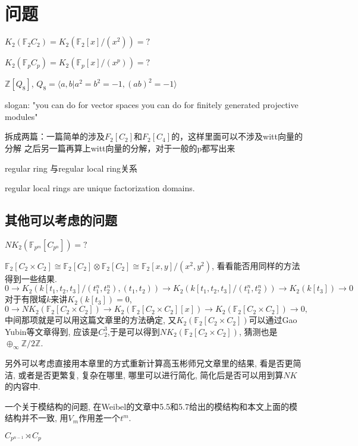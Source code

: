 \chapter{问题}
$K_2(\mathbb{F}_2C_2)=K_2(\mathbb{F}_2[x]/(x^2)) = ?$

$K_2(\mathbb{F}_pC_p)=K_2(\mathbb{F}_p[x]/(x^p)) = ?$

$\mathbb{Z}[Q_8]$, $Q_8 = \langle a,b | a^2=b^2=-1,(ab)^2=-1\rangle$

slogan: "you can do for vector spaces you can do for finitely generated projective modules"

拆成两篇：一篇简单的涉及$F_2[C_2]$和$F_2[C_4]$的，这样里面可以不涉及witt向量的分解
之后另一篇再算上witt向量的分解，对于一般的p都写出来

regular ring 与regular local ring关系
\begin{theorem}
	regular local rings are unique factorization domains.
\end{theorem}
\section{其他可以考虑的问题}

$NK_2(\mathbb{F}_{p^m}[C_{p^n}])=?$

$\mathbb{F}_2[C_2\times C_2] \cong\mathbb{F}_2[C_2]\otimes\mathbb{F}_2[C_2] \cong \mathbb{F}_2[x,y]/(x^2,y^2)$, 看看能否用同样的方法得到一些结果. 
\[
	0\longrightarrow K_2(k[t_1,t_2,t_3]/(t_1^n,t_2^n),(t_1,t_2)) \longrightarrow K_2(k[t_1,t_2,t_3]/(t_1^n,t_2^n)) \longrightarrow K_2(k[t_3]) \longrightarrow 0
	\]
对于有限域$k$来讲$K_2(k[t_3])=0$,
\[0\longrightarrow NK_2(\mathbb{F}_2[C_{2}\times C_2]) \longrightarrow K_2(\mathbb{F}_2[C_{2}\times C_2][x])\longrightarrow K_2(\mathbb{F}_2[C_{2}\times C_2]) \longrightarrow 0,\]
中间那项就是可以用这篇文章里的方法确定, 又$K_2(\mathbb{F}_2[C_{2}\times C_2])$可以通过Gao Yubin等文章得到, 应该是$C_2^3$,于是可以得到$NK_2(\mathbb{F}_2[C_{2}\times C_2])$, 猜测也是$\oplus_{\infty} \mathbb{Z}/2 \mathbb{Z}$.

另外可以考虑直接用本章里的方式重新计算高玉彬师兄文章里的结果, 看是否更简洁, 或者是否更繁复, 复杂在哪里, 哪里可以进行简化, 简化后是否可以用到算$NK$的内容中. 


一个关于模结构的问题, 在Weibel的文章\cite{MR88f:18018}中5.5和5.7给出的模结构和本文上面的模结构并不一致, 用$V_m$作用差一个$t^m$. 

$C_{p^{n-1}}\rtimes C_p$

